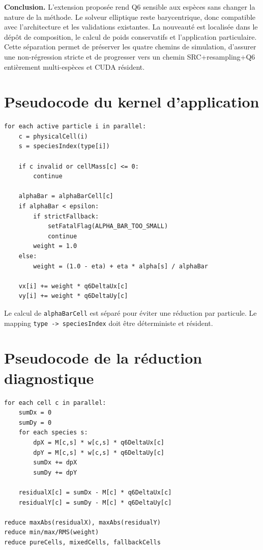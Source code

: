 \documentclass[11pt,a4paper]{article}
\newcommand{\code}[1]{\texttt{#1}}
\begin{document}
\begin{center}
\colorbox{softblue}{\parbox{0.94\linewidth}{
\textbf{Conclusion.} L'extension proposée rend Q6 sensible aux espèces sans changer la nature de la méthode. Le solveur elliptique reste barycentrique, donc compatible avec l'architecture et les validations existantes. La nouveauté est localisée dans le dépôt de composition, le calcul de poids conservatifs et l'application particulaire. Cette séparation permet de préserver les quatre chemins de simulation, d'assurer une non-régression stricte et de progresser vers un chemin SRC+resampling+Q6 entièrement multi-espèces et CUDA résident.
}}
\end{center}

\appendix
\section{Pseudocode du kernel d'application}

\begin{lstlisting}
for each active particle i in parallel:
    c = physicalCell(i)
    s = speciesIndex(type[i])

    if c invalid or cellMass[c] <= 0:
        continue

    alphaBar = alphaBarCell[c]
    if alphaBar < epsilon:
        if strictFallback:
            setFatalFlag(ALPHA_BAR_TOO_SMALL)
            continue
        weight = 1.0
    else:
        weight = (1.0 - eta) + eta * alpha[s] / alphaBar

    vx[i] += weight * q6DeltaUx[c]
    vy[i] += weight * q6DeltaUy[c]
\end{lstlisting}

Le calcul de \code{alphaBarCell} est séparé pour éviter une réduction par particule. Le mapping \code{type -> speciesIndex} doit être déterministe et résident.

\section{Pseudocode de la réduction diagnostique}

\begin{lstlisting}
for each cell c in parallel:
    sumDx = 0
    sumDy = 0
    for each species s:
        dpX = M[c,s] * w[c,s] * q6DeltaUx[c]
        dpY = M[c,s] * w[c,s] * q6DeltaUy[c]
        sumDx += dpX
        sumDy += dpY

    residualX[c] = sumDx - M[c] * q6DeltaUx[c]
    residualY[c] = sumDy - M[c] * q6DeltaUy[c]

reduce maxAbs(residualX), maxAbs(residualY)
reduce min/max/RMS(weight)
reduce pureCells, mixedCells, fallbackCells
\end{lstlisting}
\end{document}
